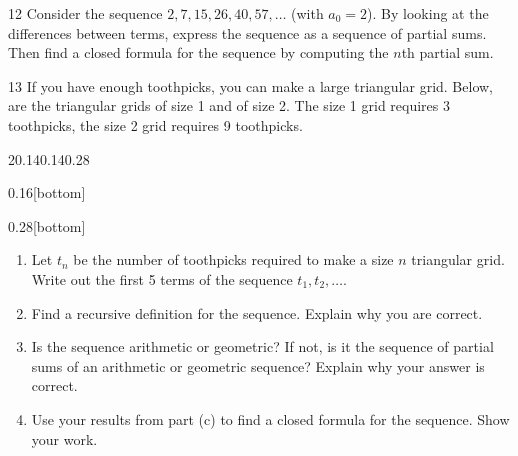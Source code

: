\documentclass[11pt,]{book}
\theoremstyle{ptxplainnotitle}
\theoremstyle{ptxplaintitle}
\theoremstyle{ptxdefinitionnotitle}
\theoremstyle{ptxdefinitiontitle}
\theoremstyle{ptxdefinitionnotitle}
\theoremstyle{ptxdefinitiontitle}
\theoremstyle{ptxdefinitionnotitle}
\theoremstyle{ptxdefinitiontitle}
\theoremstyle{ptxdefinitiontitlenonumber}
\theoremstyle{ptxdefinitiontitlenonumber}
\numberwithin{equation}{chapter}
\begin{document}
\begin{divisionexercise}{12}\hypertarget{exercise-24}{}
\hypertarget{p-319}{}%
Consider the sequence \(2, 7, 15, 26, 40, 57, \ldots\) (with \(a_0 = 2\)). By looking at the differences between terms, express the sequence as a sequence of partial sums. Then find a closed formula for the sequence by computing the \(n\)th partial sum.%
\end{divisionexercise}%
\begin{divisionexercise}{13}\hypertarget{exercise-25}{}
\hypertarget{p-321}{}%
If you have enough toothpicks, you can make a large triangular grid. Below, are the triangular grids of size 1 and of size 2. The size 1 grid requires 3 toothpicks, the size 2 grid requires 9 toothpicks.%
\begin{sidebyside}{2}{0.14}{0.14}{0.28}
\begin{sbspanel}{0.16}[bottom]
\end{sbspanel}
\begin{sbspanel}{0.28}[bottom]
\end{sbspanel}
\end{sidebyside}
\par
\hypertarget{p-322}{}%
\leavevmode%
\begin{enumerate}[label=(\alph*)]
\item\hypertarget{li-168}{}\hypertarget{p-323}{}%
Let \(t_n\) be the number of toothpicks required to make a size \(n\) triangular grid. Write out the first 5 terms of the sequence \(t_1, t_2, \ldots\). %
\item\hypertarget{li-169}{}\hypertarget{p-324}{}%
Find a recursive definition for the sequence. Explain why you are correct. %
\item\hypertarget{li-170}{}\hypertarget{p-325}{}%
Is the sequence arithmetic or geometric? If not, is it the sequence of partial sums of an arithmetic or geometric sequence? Explain why your answer is correct. %
\item\hypertarget{li-171}{}\hypertarget{p-326}{}%
Use your results from part (c) to find a closed formula for the sequence. Show your work. %
\end{enumerate}
%
\end{divisionexercise}%
\end{document}
